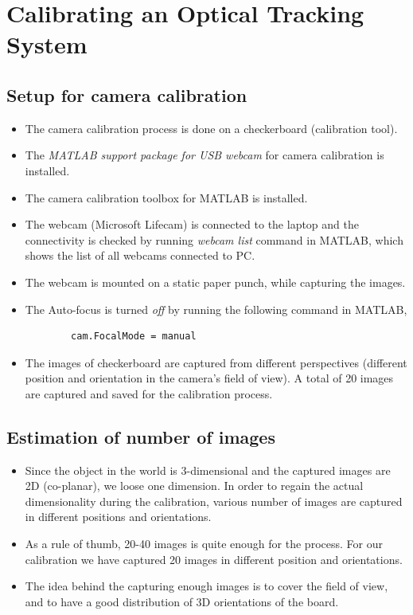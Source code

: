 \documentclass[11pt,a4paper]{article}
\begin{document}
	\newpage
	\section{Calibrating an Optical Tracking System}
	\subsection{Setup for camera calibration }
	\begin{itemize}
		\item The camera calibration process is done on a checkerboard (calibration tool).
		\item The \textit{MATLAB support package for USB webcam} for camera calibration is installed.
		\item The camera calibration toolbox for MATLAB is installed.
		\item The webcam (Microsoft Lifecam) is connected to the laptop and the connectivity is checked by running \textit{webcam list} command in MATLAB, which shows the list of all webcams connected to PC.
		\item The webcam is mounted on a static paper punch, while capturing the images.
		\item The Auto-focus is turned \textit{off} by running the following command in MATLAB,
		\begin{lstlisting}
		cam.FocalMode = manual
		\end{lstlisting}
		\item The images of checkerboard are captured from different perspectives (different position and orientation in the camera's field of view). A total of 20 images are captured and saved for the calibration process.
	\end{itemize}
	
	\subsection{Estimation of number of images}
	\begin{itemize}
		\item Since the object in the world is 3-dimensional and the captured images are 2D (co-planar), we loose one dimension. In order to regain the actual dimensionality during the calibration, various number of images are captured in different positions and orientations. 
		\item As a rule of thumb, 20-40 images is quite enough for the process. For our calibration we have captured 20 images in different position and orientations. 
		\item The idea behind the capturing enough images is to cover the field of view, and to have a good distribution of 3D orientations of the board. 
	\end{itemize}
	
\end{document}
